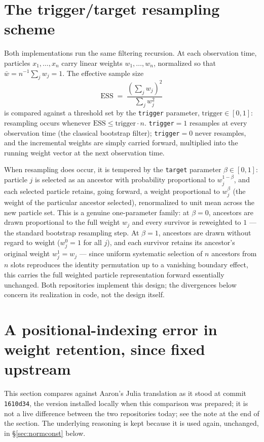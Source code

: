\documentclass[10pt]{article}
\newcommand{\ESS}{\mathrm{ESS}}
\begin{document}
\section{The trigger/target resampling scheme}

Both implementations run the same filtering recursion. At each observation
time, particles $x_1,\dots,x_n$ carry linear weights $w_1,\dots,w_n$,
normalized so that $\bar w = n^{-1}\sum_j w_j = 1$. The effective sample size
\[
  \ESS \;=\; \frac{\left(\sum_j w_j\right)^2}{\sum_j w_j^2}
\]
is compared against a threshold set by the \texttt{trigger} parameter,
$\mathrm{trigger}\in[0,1]$: resampling occurs whenever $\ESS \le
\mathrm{trigger}\cdot n$. \texttt{trigger}$=1$ resamples at every
observation time (the classical bootstrap filter); \texttt{trigger}$=0$
never resamples, and the incremental weights are simply carried forward,
multiplied into the running weight vector at the next observation time.

When resampling does occur, it is tempered by the \texttt{target} parameter
$\beta\in[0,1]$: particle $j$ is selected as an ancestor with probability
proportional to $w_j^{1-\beta}$, and each selected particle retains, going
forward, a weight proportional to $w_j^{\beta}$ (the weight of the
particular ancestor selected), renormalized to unit mean across the new
particle set. This is a genuine one-parameter family: at $\beta=0$, ancestors
are drawn proportional to the full weight $w_j$ and every survivor is
reweighted to $1$ — the standard bootstrap resampling step. At $\beta=1$,
ancestors are drawn without regard to weight ($w_j^0=1$ for all $j$), and
each survivor retains its ancestor's original weight $w_j^1=w_j$ — since
uniform systematic selection of $n$ ancestors from $n$ slots reproduces the
identity permutation up to a vanishing boundary effect, this carries the
full weighted particle representation forward essentially unchanged. Both
repositories implement this design; the divergences below concern its
realization in code, not the design itself.

\section{A positional-indexing error in weight retention, since fixed upstream}
\label{sec:positional}

This section compares against Aaron's Julia translation as it stood at
commit \texttt{1610d34}, the version installed locally when this comparison
was prepared; it is not a live difference between the two repositories
today; see the note at the end of the section. The underlying reasoning is
kept because it is used again, unchanged, in \S\ref{sec:normconst} below.
\end{document}
